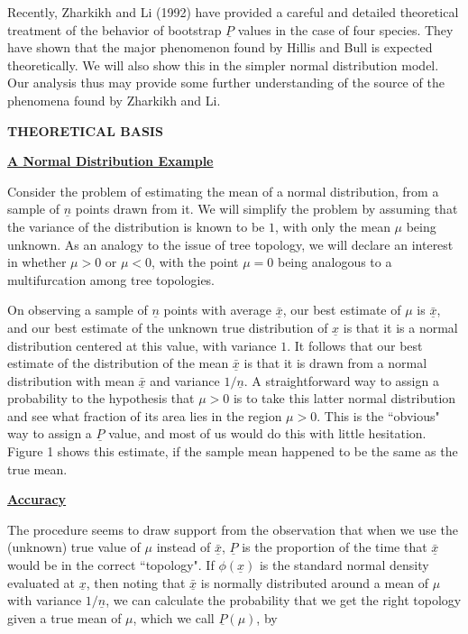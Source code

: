 {Recently, Zharkikh and Li (1992) have provided a careful and detailed
theoretical treatment of
the behavior of bootstrap $\underline{P}$ values in the case of four species.  They have
shown that the major phenomenon found by Hillis and Bull is expected
theoretically.  We will also show this in the simpler normal distribution
model.  Our analysis thus may provide some further understanding of the
source of the phenomena found by Zharkikh and Li.
\bigskip

\centerline{\bf THEORETICAL BASIS}
\bigskip

\centerline{\underline{\bf A Normal Distribution Example}}
\bigskip

Consider the problem of estimating the mean of a normal distribution,
from a sample of $\underline{n}$ points drawn from it.  We will simplify the problem
by assuming that the variance of the distribution is known to be $1$, with
only the mean $\mu$ being unknown.  As an analogy to the issue of tree
topology, we will declare an interest in whether $\mu > 0$ or $\mu < 0$,
with the point $\mu = 0$ being analogous to a multifurcation among
tree topologies.

On observing a sample of $\underline{n}$ points with average $\underline{\bar x}$, our best estimate of
$\mu$ is $\underline{\bar x}$, and our best estimate of the unknown true distribution of
$\underline{x}$ is that it is a normal distribution centered at this value, with
variance $1$.  It follows that our best estimate of the distribution of the
mean $\underline{\bar x}$ is that it is drawn from a normal distribution with mean $\underline{\bar x}$
and variance $1/\underline{n}$.  A straightforward way to
assign a probability to the hypothesis that $\mu > 0$ is to take
this latter normal distribution and see what fraction of its area lies in the
region $\mu > 0$.  This is the ``obvious" way to assign a $\underline{P}$ value, and
most of us would do this with little hesitation.  Figure 1 shows this
estimate, if the sample mean happened to be the same as the true mean.
\bigskip

\centerline{\underline{{\bf Accuracy}}}
\bigskip

The procedure seems to draw support from the observation that when we use the
(unknown) true value of $\mu$ instead of $\underline{\bar x}$, $\underline{P}$ is the proportion of
the time that $\underline{\bar x}$ would be in the correct ``topology".
If $\phi(\underline{x})$ is the standard normal density evaluated at $\underline{x}$, then noting
that $\underline{\bar x}$ is normally distributed around a mean of $\mu$ with variance
$1/\underline{n}$, we can calculate the probability that we get the right topology given a
true mean of $\mu$, which we call $\underline{P}(\mu)$, by
\bigskip
\bigskip

}
